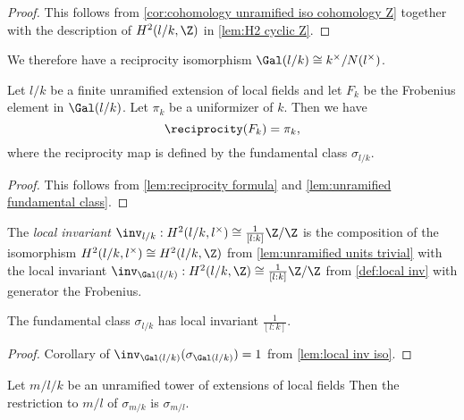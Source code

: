 \begin{proof}
	This follows from \ref{cor:cohomology unramified iso cohomology Z}
	together with the description of $H^2(l/k,\Z)$ in \ref{lem:H2 cyclic Z}.
\end{proof}

We therefore have a reciprocity isomorphism $\Gal(l/k) \cong k^\times / N(l^\times)$.

\begin{lemma} \label{lem:local unramified reciprocity}
	Let $l/k$ be a finite unramified extension of local fields and let $F_k$ be the Frobenius
	element in $\Gal(l/k)$. Let $\pi_k$ be a uniformizer of $k$. Then we have
	\[
		\reciprocity (F_k)= \pi_k,
	\]
	where the reciprocity map is defined by the fundamental class $\sigma_{l/k}$.
\end{lemma}

\begin{proof}
	This follows from \ref{lem:reciprocity formula} and \ref{lem:unramified fundamental class}.
\end{proof}


\begin{definition} \label{def:unramified local inv}

	The \emph{local invariant} $\inv_{l/k} : H^2(l/k, l^\times) \cong \frac{1}{[l:k]}\Z / \Z$ is the
	composition of the isomorphism $H^2(l/k, l^\times) \cong H^2(l/k, \Z)$
	from \ref{lem:unramified units trivial} with the local invariant
	$\inv_{\Gal(l/k)} : H^2(l/k, \Z) \cong \frac{1}{[l:k]}\Z / \Z$ from \ref{def:local inv} with
  generator the Frobenius.
\end{definition}

\begin{lemma} \label{lem:local inv fundamental class}
	The fundamental class $\sigma_{l/k}$ has local invariant $\frac{1}{[l:k]}$.
\end{lemma}

\begin{proof}
	Corollary of $\inv_{\Gal(l/k)}(\sigma_{\Gal(l/k)}) = 1$ from \ref{lem:local inv iso}.
\end{proof}


\begin{lemma} \label{lem:local unram rest}
	Let $m / l / k$ be an unramified tower of extensions of local fields
	Then the restriction to $m/l$ of $\sigma_{m/k}$ is $\sigma_{m/l}$.
\end{lemma}

